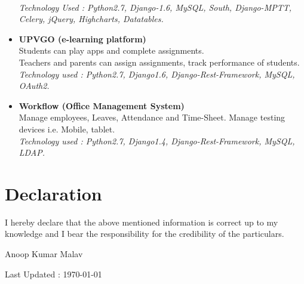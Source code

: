 \documentclass[11pt]{article}
\begin{document}
\begin{itemize}
    \\ \textit{Technology Used : Python2.7, Django-1.6, MySQL, South, Django-MPTT, Celery, jQuery, Highcharts, Datatables.}
 \item \textbf{UPVGO (e-learning platform)}
    \\ Students can play apps and complete assignments.
    \\ Teachers and parents can assign assignments, track performance of students.
    \\ \textit{Technology used : Python2.7, Django1.6, Django-Rest-Framework, MySQL, OAuth2.}
 \item \textbf{Workflow (Office Management System)}
    \\ Manage employees, Leaves, Attendance and Time-Sheet. Manage testing devices i.e. Mobile, tablet.
    \\ \textit{Technology used : Python2.7, Django1.4, Django-Rest-Framework, MySQL, LDAP.}
\end{itemize}


\section*{Declaration}
I hereby declare that the above mentioned information is correct up to
my knowledge and I bear the responsibility for the credibility of the particulars.\\
\begin{flushright}
 Anoop Kumar Malav
\end{flushright}
\begin{center}

Last Updated : \today

\end{center}
\end{document}
